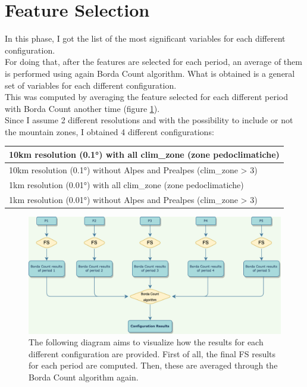 \pagebreak
\section{Feature Selection}
In this phase, I got the list of the most significant variables for each different configuration.\\
For doing that, after the features are selected for each period, an average of them is performed using again Borda Count algorithm. What is obtained is a general set of variables for each different configuration.\\
This was computed by averaging the feature selected for each different period with Borda Count another time (figure \ref{fig:overview_configuration}).\\
Since I assume 2 different resolutions and with the possibility to include or not the mountain zones, I obtained 4 different configurations: 
\par
\begin{table}[H]
    \centering
    \begin{tabular}{|l|}
    \hline
        10km resolution (0.1°) with all clim\_zone (zone pedoclimatiche)  \\ \hline
        10km resolution (0.1°) without Alpes and Prealpes (clim\_zone > 3) \\ \hline
        1km resolution (0.01°) with all clim\_zone (zone pedoclimatiche)   \\ \hline
        1km resolution (0.01°) without Alpes and Prealpes (clim\_zone > 3)  \\ \hline
    \end{tabular}
\end{table}
\bigbreak
\begin{figure}[H]
    \centering
    \includegraphics[width=.9\textwidth]{images/overview_results_configuration.png}
    \caption{The following diagram aims to visualize how the results for each different configuration are provided. First of all,  the final FS results for each period are computed. Then, these are averaged through the Borda Count algorithm again.}
    \label{fig:overview_configuration}
\end{figure}


